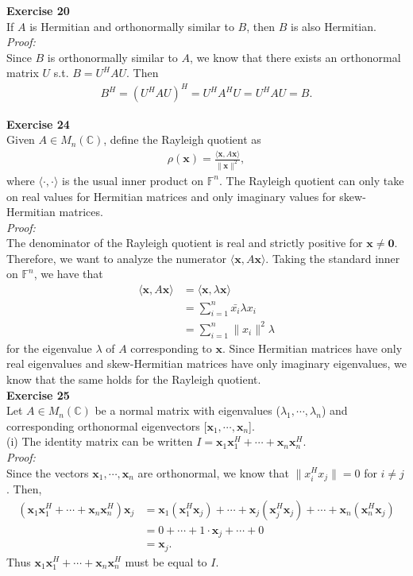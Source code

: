 \documentclass[letterpaper,12pt]{article}
\let\vec\mathbf
\theoremstyle{definition}
\begin{document}
\textbf{Exercise 20} \\
If $A$ is Hermitian and orthonormally similar to $B$, then $B$ is also Hermitian. \\
\textit{Proof:} \\
Since $B$ is orthonormally similar to $A$, we know that there exists an orthonormal matrix $U$ s.t. $B = U^H A U$. Then
\begin{align*}
  B^H = (U^H A U)^H = U^H A^H U = U^H A U = B.
\end{align*}

\textbf{Exercise 24} \\
Given $A \in M_n(\mathbb{C})$, define the Rayleigh quotient as
\begin{align*}
  \rho(\vec{x}) = \frac{\langle \vec{x}, A\vec{x} \rangle}{\|\vec{x}\|^2},
\end{align*}
where $\langle\cdot, \cdot\rangle$ is the usual inner product on $\mathbb{F}^n$. The Rayleigh quotient can only take on real values for Hermitian matrices and only imaginary values for skew-Hermitian matrices. \\
\textit{Proof:} \\
The denominator of the Rayleigh quotient is real and strictly positive for $\vec{x} \neq \vec{0}$. Therefore, we want to analyze the numerator $\langle \vec{x}, A\vec{x} \rangle$. Taking the standard inner on $\mathbb{F}^n$, we have that
\begin{align*}
  \langle \vec{x}, A\vec{x} \rangle &= \langle \vec{x}, \lambda \vec{x} \rangle \\
  &= \sum_{i=1}^n \bar{x_i} \lambda x_i \\
  &= \sum_{i=1}^n \|x_i\|^2 \lambda
\end{align*}
for the eigenvalue $\lambda$ of $A$ corresponding to $\vec{x}$. Since Hermitian matrices have only real eigenvalues and skew-Hermitian matrices have only imaginary eigenvalues, we know that the same holds for the Rayleigh quotient. \\

\textbf{Exercise 25} \\
Let $A \in M_n(\mathbb{C})$ be a normal matrix with eigenvalues ($\lambda_1, \cdots, \lambda_n$) and corresponding orthonormal eigenvectors [$\vec{x}_1, \cdots, \vec{x}_n$]. \\
(i) The identity matrix can be written $I = \vec{x}_1 \vec{x}_1^H + \cdots + \vec{x}_n \vec{x}_n^H$. \\
\textit{Proof:} \\
Since the vectors $\vec{x}_1, \cdots, \vec{x}_n$ are orthonormal, we know that $\|x_i^H x_j\| = 0$ for $i \neq j$. Then,
\begin{align*}
  (\vec{x}_1 \vec{x}_1^H + \cdots + \vec{x}_n \vec{x}_n^H)\vec{x}_j
  &= \vec{x}_1 (\vec{x}_1^H \vec{x}_j) + \cdots + \vec{x}_j (\vec{x}_j^H \vec{x}_j) + \cdots + \vec{x}_n (\vec{x}_n^H \vec{x}_j) \\
  &= 0 + \cdots + 1 \cdot \vec{x}_j + \cdots + 0 \\
  &= \vec{x}_j.
\end{align*}
Thus $\vec{x}_1 \vec{x}_1^H + \cdots + \vec{x}_n \vec{x}_n^H$ must be equal to $I$. \\
\end{document}
